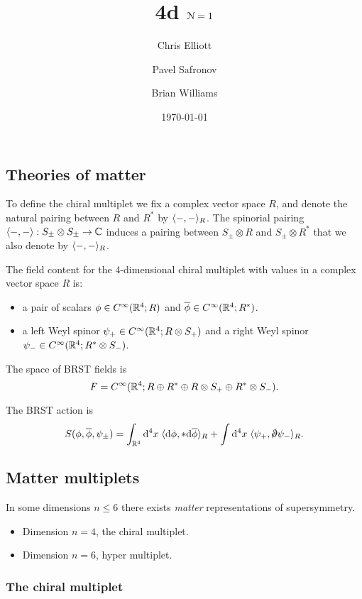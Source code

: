 \documentclass[10pt, oneside]{article}
\title{4d $\mathcal N=1$}
\author{Chris Elliott\and Pavel Safronov \and Brian Williams}
\date{\today}
\begin{document}
\maketitle

\subsection{Theories of matter}
To define the chiral multiplet we fix a complex vector space $R$, and denote the natural pairing between $R$ and $R^*$ by $\langle-,-\rangle_R$. 
The spinorial pairing $\langle-,-\rangle : S_\pm \otimes S_\pm \to \mathbb C$ induces a pairing between $S_\pm \otimes R$ and $S_{\pm} \otimes R^*$ that we also denote by $\langle-,-\rangle_R$. 

The field content for the 4-dimensional chiral multiplet with values in a complex vector space $R$ is:
\begin{itemize}
\item a pair of scalars $\phi \in C^\infty(\mathbb R^4 ; R)$ and $\overline{\phi} \in C^\infty(\mathbb R^4 ; R^*)$.
\item a left Weyl spinor $\psi_+ \in C^\infty(\mathbb R^4 ; R \otimes S_+)$ and a right Weyl spinor $\psi_- \in C^\infty(\mathbb R^4 ; R^* \otimes S_-)$.
\end{itemize}

The space of BRST fields is 
\[
F = C^\infty(\mathbb R^4 ; R \oplus R^* \oplus R \otimes S_+ \oplus R^* \otimes S_-) .
\]

The BRST action is
\[
S (\phi, \Bar{\phi}, \psi_\pm) = \int_{\RR^4} \d^4 x \; \<\d \phi , * \d \Bar{\phi}\>_R + \int \d^4 x \; \<\psi_+ , \sd \dd \psi_-\>_R .
\]

\subsection{Matter multiplets}

In some dimensions $n \leq 6$ there exists {\em matter} representations of supersymmetry. 

\begin{itemize}
\item Dimension $n=4$, the chiral multiplet.
\item Dimension $n=6$, hyper multiplet. 
\end{itemize}

\subsubsection{The chiral multiplet}
\end{document}
